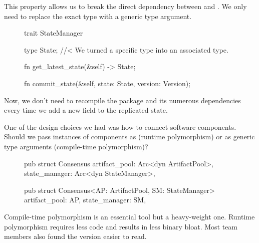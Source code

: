 \documentclass{article}
\begin{document}
This property allows us to break the direct dependency between  and .
We only need to replace the exact type with a generic type argument.

\begin{figure}
\begin{code}[good]
trait StateManager {
  type State; //< We turned a specific type into an associated type.
  
  fn get_latest_state(&self) -> State;

  fn commit_state(&self, state: State, version: Version);
}
\end{code}
\end{figure}

Now, we don't need to recompile the  package and its numerous dependencies every time we add a new field to the replicated state.


One of the design choices we had was how to connect software components.
Should we pass instances of components as  (runtime polymorphism) or as generic type arguments (compile-time polymorphism)?

\begin{figure}
\begin{code}[good]
pub struct Consensus {
  artifact_pool: Arc<dyn ArtifactPool>,
  state_manager: Arc<dyn StateManager>,
}
\end{code}
\end{figure}

\begin{figure}
\begin{code}[bad]
pub struct Consensus<AP: ArtifactPool, SM: StateManager> {
  artifact_pool: AP,
  state_manager: SM,
}
\end{code}
\end{figure}

Compile-time polymorphism is an essential tool but a heavy-weight one.
Runtime polymorphism requires less code and results in less binary bloat.
Most team members also found the  version easier to read.

\end{document}
